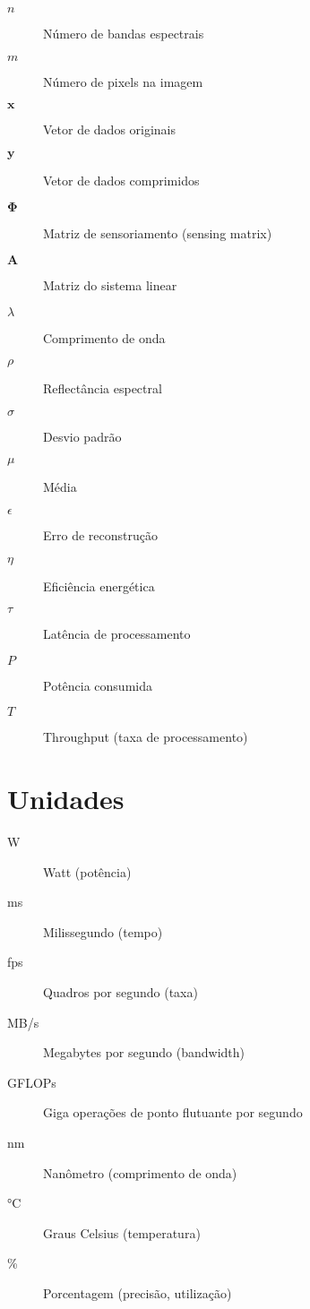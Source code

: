 \begin{description}
\item[$n$] Número de bandas espectrais
\item[$m$] Número de pixels na imagem
\item[$\mathbf{x}$] Vetor de dados originais
\item[$\mathbf{y}$] Vetor de dados comprimidos
\item[$\mathbf{\Phi}$] Matriz de sensoriamento (sensing matrix)
\item[$\mathbf{A}$] Matriz do sistema linear
\item[$\lambda$] Comprimento de onda
\item[$\rho$] Reflectância espectral
\item[$\sigma$] Desvio padrão
\item[$\mu$] Média
\item[$\epsilon$] Erro de reconstrução
\item[$\eta$] Eficiência energética
\item[$\tau$] Latência de processamento
\item[$P$] Potência consumida
\item[$T$] Throughput (taxa de processamento)
\end{description}

\section*{Unidades}

\begin{description}
\item[W] Watt (potência)
\item[ms] Milissegundo (tempo)
\item[fps] Quadros por segundo (taxa)
\item[MB/s] Megabytes por segundo (bandwidth)
\item[GFLOPs] Giga operações de ponto flutuante por segundo
\item[nm] Nanômetro (comprimento de onda)
\item[°C] Graus Celsius (temperatura)
\item[\%] Porcentagem (precisão, utilização)
\end{description}
